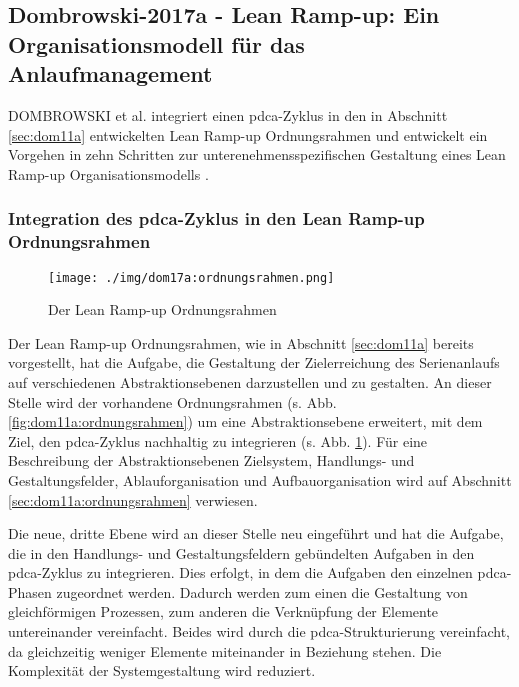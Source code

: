 \subsection*{Dombrowski-2017a - Lean Ramp-up: Ein Organisationsmodell für das Anlaufmanagement}

DOMBROWSKI et al. integriert einen \gls{pdca}-Zyklus in den in Abschnitt \ref{sec:dom11a} entwickelten Lean Ramp-up Ordnungsrahmen und entwickelt ein Vorgehen in zehn Schritten zur unterenehmensspezifischen Gestaltung eines Lean Ramp-up Organisationsmodells \cite{Dombrowski2017a}. 

\subsubsection{Integration des \gls{pdca}-Zyklus in den Lean Ramp-up Ordnungsrahmen}
\begin{figure}[h]
 \centering
 \texttt{[image: ./img/dom17a:ordnungsrahmen.png]}
 \caption[Der Lean Ramp-up Ordnungsrahmen]{Der Lean Ramp-up Ordnungsrahmen \cite{Dombrowski2017a}}
 \label{fig:dom17a:ordnungsrahmen}
\end{figure}

Der Lean Ramp-up Ordnungsrahmen, wie in Abschnitt \ref{sec:dom11a} bereits vorgestellt, hat die Aufgabe, die Gestaltung der Zielerreichung des Serienanlaufs auf verschiedenen Abstraktionsebenen darzustellen und zu gestalten. 
An dieser Stelle wird der vorhandene Ordnungsrahmen (s. Abb. \ref{fig:dom11a:ordnungsrahmen}) um eine Abstraktionsebene erweitert, mit dem Ziel, den \gls{pdca}-Zyklus nachhaltig zu integrieren (s. Abb. \ref{fig:dom17a:ordnungsrahmen}). 
Für eine Beschreibung der Abstraktionsebenen Zielsystem, Handlungs- und Gestaltungsfelder, Ablauforganisation und Aufbauorganisation wird auf Abschnitt \ref{sec:dom11a:ordnungsrahmen} verwiesen. 

Die neue, dritte Ebene wird an dieser Stelle neu eingeführt und hat die Aufgabe, die in den Handlungs- und Gestaltungsfeldern gebündelten Aufgaben in den \gls{pdca}-Zyklus zu integrieren. Dies erfolgt, in dem die Aufgaben den einzelnen \gls{pdca}-Phasen zugeordnet werden. Dadurch werden zum einen die Gestaltung von gleichförmigen Prozessen, zum anderen die Verknüpfung der Elemente untereinander vereinfacht. Beides wird durch die \gls{pdca}-Strukturierung vereinfacht, da gleichzeitig weniger Elemente miteinander in Beziehung stehen. Die Komplexität der Systemgestaltung wird reduziert. 

